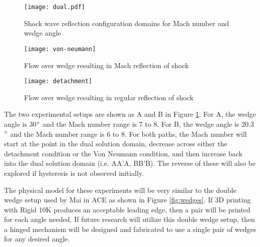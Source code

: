 

\begin{figure}[ht!]
    \centering
    \texttt{[image: dual.pdf]}
    \caption{Shock wave reflection configuration domains for Mach number and wedge angle}
    \label{fig:dual}
\end{figure}

\begin{figure}[ht!]
    \centering
    \texttt{[image: von-neumann]}
    \caption[Flow over wedge resulting in Mach reflection of shock]{Flow over wedge resulting in Mach reflection of shock \cite{mouton}}
    \label{fig:von-neumann}
\end{figure}

\begin{figure}[ht!]
    \centering
    \texttt{[image: detachment]}
    \caption[Flow over wedge resulting in regular reflection of shock]{Flow over wedge resulting in regular reflection of shock \cite{mouton}}
    \label{fig:detachment}
\end{figure}

The two experimental setups are shown as A and B in Figure \ref{fig:dual}. For A, the wedge angle is 30$\degree$ and the Mach number range is 7 to 8. For B, the wedge angle is 20.3$\degree$ and the Mach number range is 6 to 8. For both paths, the Mach number will start at the point in the dual solution domain, decrease across either the detachment condition or the Von Neumann condition, and then increase back into the dual solution domain (i.e. AA'A, BB'B). The reverse of these will also be explored if hysteresis is not observed initially.

The physical model for these experiments will be very similar to the double wedge setup used by Mai \cite{mai-dis} in ACE as shown in Figure \ref{fig:wedges}. If 3D printing with Rigid 10K produces an acceptable leading edge, then a pair will be printed for each angle needed. If future research will utilize this double wedge setup, then a hinged mechanism will be designed and fabricated to use a single pair of wedges for any desired angle.

